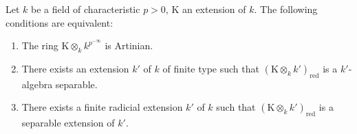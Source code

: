 \begin{lemma}[18.11.12.1]
\label{IV.18.11.12.1}
Let $k$ be a field of characteristic $p>0$, $\mathrm{K}$ an extension of $k$.
The following conditions are equivalent:
\begin{enumerate}[label=\alph*)]
  \item The ring $\mathrm{K}\otimes_kk^{p^{-\infty}}$ is Artinian.
  \item There exists an extension $k'$ of $k$ of finite type such that $(\mathrm{K}\otimes_kk')_{\mathrm{red}}$ is a $k'$-algebra separable.
  \item There exists a finite radicial extension $k'$ of $k$ such that $(\mathrm{K}\otimes_kk')_\mathrm{red}$ is a separable extension of $k'$.
\end{enumerate}
\end{lemma}

